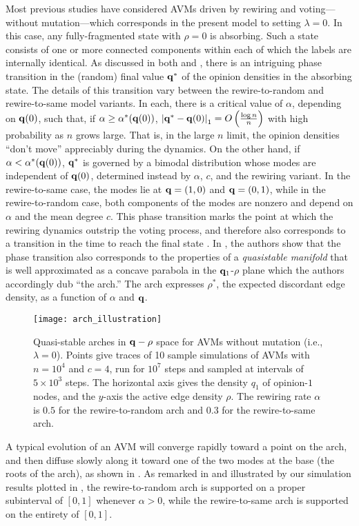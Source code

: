 \documentclass[review, onefignum, onetabnum]{siamart171218}
\begin{document}
	Most previous studies have considered AVMs driven by rewiring and voting---without mutation---which corresponds in the present model to setting $\lambda = 0$. 
	In this case, any fully-fragmented state with $\rho = 0$ is absorbing. 
	Such a state consists of one or more connected components within each of which the labels are internally identical. 
	As discussed in both \cite{Holme2006} and \cite{Durrett2012}, there is an intriguing phase transition in the (random) final value $\mathbf{q}^*$ of the opinion densities in the absorbing state.
	The details of this transition vary between the rewire-to-random and rewire-to-same model variants. 
	In each, there is a critical value of $\alpha$, depending on $\mathbf{q}(0)$, such that, if
	$\alpha \geq \alpha^*(\mathbf{q}(0))$, $\left|\mathbf{q}^* - \mathbf{q}(0)\right|_1 = O\left(\frac{\log n}{n}\right)$ with high probability as $n$ grows large. 
	That is, in the large $n$ limit, the opinion densities ``don't move'' appreciably during the dynamics. 
	On the other hand, if $\alpha < \alpha^*(\mathbf{q}(0))$, $\mathbf{q}^*$ is governed by a bimodal distribution whose modes are independent of $\mathbf{q}(0)$, determined instead by $\alpha$, $c$, and the rewiring variant. 
	In the rewire-to-same case, the modes lie at $\mathbf{q} = (1,0)$ and $\mathbf{q} = (0,1)$, while in the rewire-to-random case, both components of the modes are nonzero and depend on $\alpha$ and the mean degree $c$. 
	This phase transition marks the point at which the rewiring dynamics outstrip the voting process, and therefore also corresponds to a transition in the time to reach the final state \cite{Holme2006,Rogers2013}. 
	In \cite{Durrett2012}, the authors show that the phase transition also corresponds to the properties of a \emph{quasistable manifold} that is well approximated as a concave parabola in the $\mathbf{q}_1$-$\rho$ plane which the authors accordingly dub ``the arch.'' 
	The arch expresses $\rho^*$, the expected discordant edge density, as a function of $\alpha$ and $\mathbf{q}$. 
	\begin{figure}
	 	\centering
	 	\texttt{[image: arch\_illustration]}
	 	\caption{Quasi-stable arches in $\mathbf{q}-\rho$ space for AVMs without mutation (i.e., $\lambda=0$). 
	 	Points give traces of 10 sample simulations of AVMs with $n = 10^4$ and $c = 4$, run for $10^7$ steps and sampled at intervals of $5\times 10^3$ steps. 
	 	The horizontal axis gives the density $q_1$ of opinion-$1$ nodes, and the $y$-axis the active edge density $\rho$. 
	 	The rewiring rate $\alpha$ is $0.5$ for the rewire-to-random arch and $0.3$ for the rewire-to-same arch.} 
	 	\label{fig:arch_illustration}
	\end{figure} 
	A typical evolution of an AVM will converge rapidly toward a point on the arch, and then diffuse slowly along it toward one of the two modes at the base (the roots of the arch), as shown in .
	As remarked in \cite{Durrett2012} and illustrated by our simulation results plotted in  , the rewire-to-random arch is supported on a proper subinterval of $[0,1]$ whenever $\alpha >0$, while the rewire-to-same arch is supported on the entirety of $[0,1]$. 
	
\end{document}
